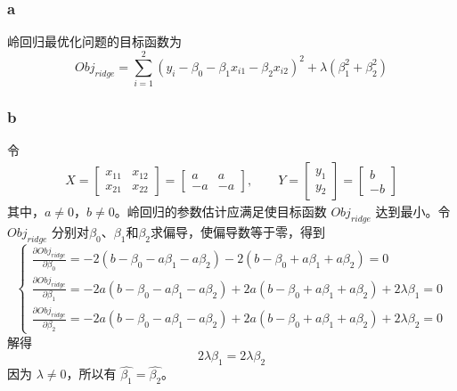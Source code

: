 \documentclass[12pt,a4paper]{article}
\begin{document}
    \title{}
    \date{}
    \author{姓名：\underline{刘哲}~~~~~~学号：\underline{2022103691}~~~~~~}
    \maketitle
    \section{}
    \vspace{10pt}
    \subsubsection*{a}
    岭回归最优化问题的目标函数为
    \begin{equation}
        Obj_{ridge}=\sum_{i=1}^2\left(y_i-\beta_0-\beta_1x_{i1}-\beta_2x_{i2}\right)^2+\lambda\left(\beta_1^2+\beta_2^2\right)
    \end{equation}
    \subsubsection*{b}
    令
    \begin{gather}
        X=\begin{bmatrix}
            x_{11} & x_{12}\\
            x_{21} & x_{22}
        \end{bmatrix}=\begin{bmatrix}
            a & a\\
            -a & -a
        \end{bmatrix},\qquad Y=\begin{bmatrix}
            y_1\\
            y_2
        \end{bmatrix}=\begin{bmatrix}
            b\\
            -b
        \end{bmatrix}
    \end{gather}
    其中，$a\neq0$，$b\neq0$。岭回归的参数估计应满足使目标函数 $Obj_{ridge}$ 达到最小。令 $Obj_{ridge}$ 分别对$\beta_0$、$\beta_1$和$\beta_2$求偏导，使偏导数等于零，得到
    \begin{equation}
        \begin{cases}
            \frac{\partial Obj_{ridge}}{\partial\beta_0}=-2\left(b-\beta_0-a\beta_1-a\beta_2\right)-2\left(b-\beta_0+a\beta_1+a\beta_2\right)=0\\
            \frac{\partial Obj_{ridge}}{\partial\beta_1}=-2a\left(b-\beta_0-a\beta_1-a\beta_2\right)+2a\left(b-\beta_0+a\beta_1+a\beta_2\right)+2\lambda\beta_1=0\\
            \frac{\partial Obj_{ridge}}{\partial\beta_2}=-2a\left(b-\beta_0-a\beta_1-a\beta_2\right)+2a\left(b-\beta_0+a\beta_1+a\beta_2\right)+2\lambda\beta_2=0
        \end{cases}
    \end{equation}
    解得
    \begin{equation}
        2\lambda\beta_1=2\lambda\beta_2
    \end{equation}
    因为 $\lambda\neq 0$，所以有 $\hat{\beta_1}=\hat{\beta_2}$。
\end{document}
